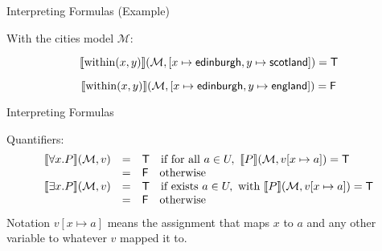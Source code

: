 \documentclass[xetex,aspectratio=169,14pt,hyperref={pdfpagelabels=true,pdflang={en-GB}}]{beamer}
\begin{document}
\begin{frame}
  {Interpreting Formulas (Example)}

  With the cities model $\mathcal{M}$:

  \bigskip

  \begin{displaymath}
    \llbracket \mathrm{within}(x,y) \rrbracket(\mathcal{M}, [x\mapsto \mathsf{edinburgh}, y \mapsto \mathsf{scotland}]) = \mathsf{T}
  \end{displaymath}

  \bigskip

  \begin{displaymath}
    \llbracket \mathrm{within}(x,y) \rrbracket(\mathcal{M}, [x\mapsto \mathsf{edinburgh}, y \mapsto \mathsf{england}]) = \mathsf{F}
  \end{displaymath}
\end{frame}

\begin{frame}
  {Interpreting Formulas}

  Quantifiers:
  \begin{displaymath}
    \begin{array}{lcl}
      \llbracket \forall x. P \rrbracket(\mathcal{M},v) & = & \mathsf{T} \quad\textrm{if for all }a \in U,~\llbracket P \rrbracket(\mathcal{M},v[x \mapsto a]) = \mathsf{T} \\
      & = & \mathsf{F} \quad \textrm{otherwise} \\
      \llbracket \exists x. P \rrbracket(\mathcal{M},v) & = & \mathsf{T} \quad\textrm{if exists }a \in U,\textrm{ with }\llbracket P \rrbracket(\mathcal{M},v[x \mapsto a]) = \mathsf{T} \\
      & = & \mathsf{F} \quad \textrm{otherwise} \\
    \end{array}
  \end{displaymath}
  Notation $v[x \mapsto a]$ means the assignment that maps $x$ to $a$
  and any other variable to whatever $v$ mapped it to.
\end{frame}
\end{document}
